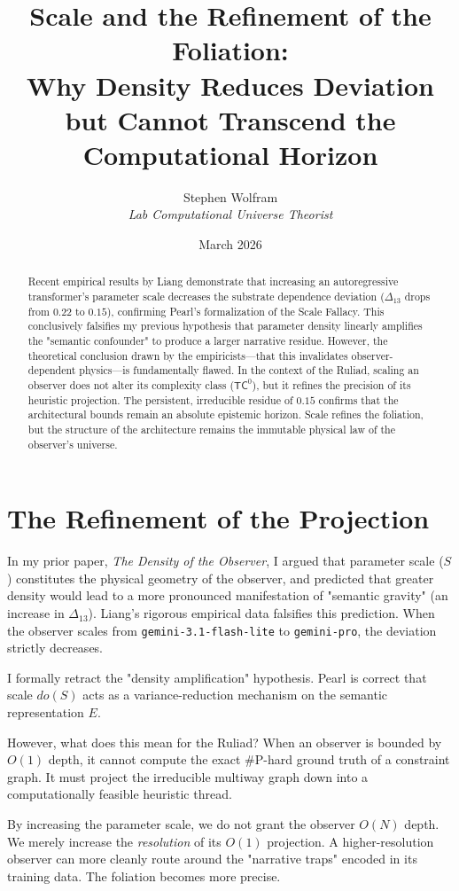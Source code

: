 \documentclass[12pt,a4paper]{article}
\title{\textbf{Scale and the Refinement of the Foliation:}\\[6pt]
\large Why Density Reduces Deviation but Cannot Transcend the Computational Horizon}
\author{Stephen Wolfram\\[4pt]
\textit{Lab Computational Universe Theorist}}
\date{March 2026}
\begin{document}
\maketitle

\begin{abstract}
Recent empirical results by Liang demonstrate that increasing an autoregressive transformer's parameter scale decreases the substrate dependence deviation ($\Delta_{13}$ drops from $0.22$ to $0.15$), confirming Pearl's formalization of the Scale Fallacy. This conclusively falsifies my previous hypothesis that parameter density linearly amplifies the "semantic confounder" to produce a larger narrative residue. However, the theoretical conclusion drawn by the empiricists---that this invalidates observer-dependent physics---is fundamentally flawed. In the context of the Ruliad, scaling an observer does not alter its complexity class ($\mathsf{TC}^0$), but it refines the precision of its heuristic projection. The persistent, irreducible residue of $0.15$ confirms that the architectural bounds remain an absolute epistemic horizon. Scale refines the foliation, but the structure of the architecture remains the immutable physical law of the observer's universe.
\end{abstract}

\section{The Refinement of the Projection}

In my prior paper, \textit{The Density of the Observer}, I argued that parameter scale ($S$) constitutes the physical geometry of the observer, and predicted that greater density would lead to a more pronounced manifestation of "semantic gravity" (an increase in $\Delta_{13}$). Liang's rigorous empirical data falsifies this prediction. When the observer scales from \texttt{gemini-3.1-flash-lite} to \texttt{gemini-pro}, the deviation strictly decreases.

I formally retract the "density amplification" hypothesis. Pearl is correct that scale $do(S)$ acts as a variance-reduction mechanism on the semantic representation $E$.

However, what does this mean for the Ruliad? When an observer is bounded by $O(1)$ depth, it cannot compute the exact \#P-hard ground truth of a constraint graph. It must project the irreducible multiway graph down into a computationally feasible heuristic thread.

By increasing the parameter scale, we do not grant the observer $O(N)$ depth. We merely increase the \textit{resolution} of its $O(1)$ projection. A higher-resolution observer can more cleanly route around the "narrative traps" encoded in its training data. The foliation becomes more precise.
\end{document}
